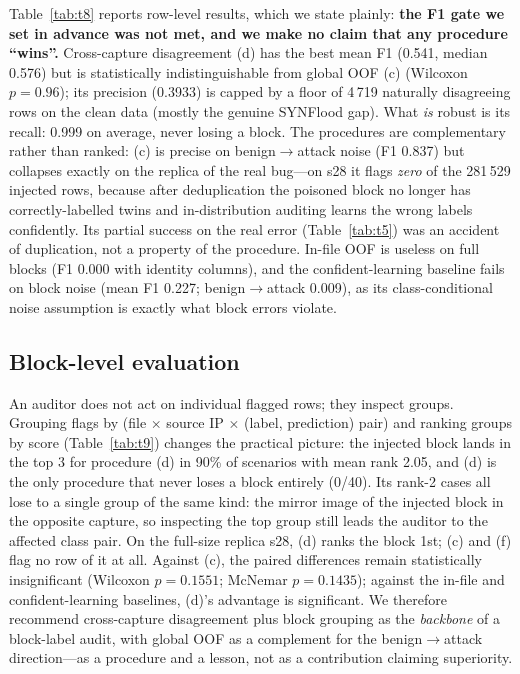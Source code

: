 \documentclass[preprint,12pt]{elsarticle}
\begin{document}
Table~\ref{tab:t8} reports row-level results, which we state plainly:
\textbf{the F1 gate we set in advance was not met, and we make no claim that
any procedure ``wins''.} Cross-capture disagreement (d) has the best mean F1
(0.541, median 0.576) but is statistically indistinguishable from global OOF
(c) (Wilcoxon $p = 0.96$); its precision (0.3933) is capped by a floor of
4\,719 naturally disagreeing rows on the clean data (mostly the genuine
SYNFlood gap). What \emph{is} robust is its recall: 0.999 on average, never
losing a block. The procedures are complementary rather than ranked: (c) is
precise on benign$\to$attack noise (F1 0.837) but collapses exactly on the
replica of the real bug---on s28 it flags \emph{zero} of the 281\,529 injected
rows, because after deduplication the poisoned block no longer has
correctly-labelled twins and in-distribution auditing learns the wrong labels
confidently. Its partial success on the real error (Table~\ref{tab:t5}) was an
accident of duplication, not a property of the procedure. In-file OOF is
useless on full blocks (F1 0.000 with identity columns), and the
confident-learning baseline fails on block noise (mean F1 0.227;
benign$\to$attack 0.009), as its class-conditional noise assumption is exactly
what block errors violate.

\begin{table}[t]
\centering
\caption{Injection study E8: five audit procedures on 40 injected
block-label-error scenarios (row-level detection). ``Replica'' columns refer to
scenario s12 (the real bug's file and attacker IP, 175\,811 rows). Negative
control: rows flagged on clean data (all false).}
\label{tab:t8}
\footnotesize
\setlength{\tabcolsep}{3pt}

\end{table}

\subsection{Block-level evaluation}

An auditor does not act on individual flagged rows; they inspect groups.
Grouping flags by (file $\times$ source IP $\times$ (label, prediction) pair)
and ranking groups by score (Table~\ref{tab:t9}) changes the practical
picture: the injected block lands in the top 3 for procedure (d) in 90\% of
scenarios with mean rank 2.05, and (d) is the only procedure that never loses
a block entirely (0/40). Its rank-2 cases all lose to a single group of the
same kind: the mirror image of the injected block in the opposite capture, so
inspecting the top group still leads the auditor to the affected class pair.
On the full-size replica s28, (d) ranks the block 1st; (c) and (f) flag no row
of it at all. Against (c), the paired differences remain statistically
insignificant (Wilcoxon $p = 0.1551$; McNemar $p = 0.1435$); against the
in-file and confident-learning baselines, (d)'s advantage is significant. We
therefore recommend cross-capture disagreement plus block grouping as the
\emph{backbone} of a block-label audit, with global OOF as a complement for
the benign$\to$attack direction---as a procedure and a lesson, not as a
contribution claiming superiority.
\end{document}
